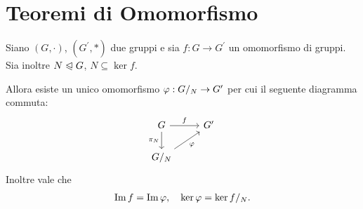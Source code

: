 \section{Teoremi di Omomorfismo}

\begin{theorem}
     \label{th:first_iso}
    Siano $(G, \cdot)$, $(G^\prime, *)$ due gruppi e sia $f : G \to G^\prime$ un omomorfismo di gruppi. Sia inoltre $N \trianglelefteqslant G$, $N \subseteq \ker f$.

    Allora esiste un unico omomorfismo $\varphi : {G}/_{N} \to G^\prime$ per cui il seguente diagramma commuta:
    \begin{equation}
        \begin{tikzcd}
            G \arrow[d, swap, "\pi_N"] \arrow[r, "f"] & G^\prime \\
            \quot{G}{N} \arrow[ur, swap, "\phi"] &
        \end{tikzcd}
    \end{equation}
    Inoltre vale che \begin{align*}
        \operatorname{Im} f = \operatorname{Im} \varphi, \quad \ker \varphi = {\ker f}/_{N}.
    \end{align*}
\end{theorem}

